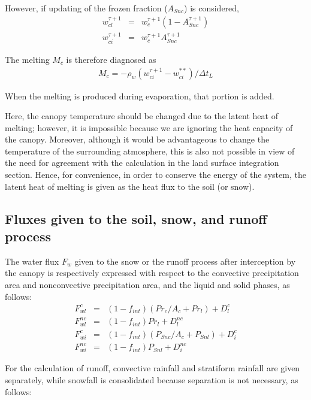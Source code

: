 However, if updating of the frozen fraction (\(A_{Snc}\)) is considered, \begin{eqnarray}
 w_{cl}^{\tau+1} &=& w_{c}^{\tau+1} (1-A_{Snc}^{\tau+1}) \\
 w_{ci}^{\tau+1} &=& w_{c}^{\tau+1} A_{Snc}^{\tau+1}
\end{eqnarray}

The melting \(M_c\) is therefore diagnosed as \begin{eqnarray}
 M_c = - \rho_w ( w_{ci}^{\tau+1} - w_{ci}^{\ast\ast} ) / \Delta t_L
\end{eqnarray}

When the melting is produced during evaporation, that portion is added.

Here, the canopy temperature should be changed due to the latent heat of melting; however, it is impossible because we are ignoring the heat capacity of the canopy. Moreover, although it would be
advantageous to change the temperature of the surrounding atmosphere, this is also not possible in view of the need for agreement with the calculation in the land surface integration section. Hence,
for convenience, in order to conserve the energy of the system, the latent heat of melting is given as the heat flux to the soil (or snow).

\subsection{Fluxes given to the soil, snow, and runoff process}\label{fluxes-given-to-the-soil-snow-and-runoff-process}

The water flux \(F_w\) given to the snow or the runoff process after interception by the canopy is respectively expressed with respect to the convective precipitation area and nonconvective
precipitation area, and the liquid and solid phases, as follows: \begin{eqnarray}
 F_{wl}^{c} &=& (1-f_{int})( Pr_c / A_c + Pr_l ) + D_{l}^{c} \\
 F_{wl}^{nc} &=&(1-f_{int}) Pr_l + D_{l}^{nc} \\
 F_{wi}^{c} &=& (1-f_{int})( P_{Snc} / A_c + P_{Snl} ) + D_{i}^{c} \\
 F_{wi}^{nc} &=&(1-f_{int}) P_{Snl} + D_{i}^{nc}
\end{eqnarray}

For the calculation of runoff, convective rainfall and stratiform rainfall are given separately, while snowfall is consolidated because separation is not necessary, as follows:

